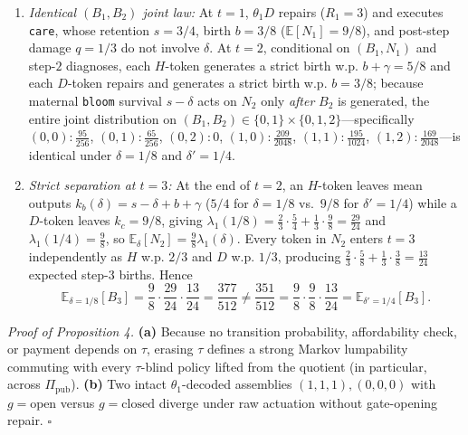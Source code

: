 \documentclass[12pt,letterpaper]{article}
\providecommand{\tightlist}{\setlength{\itemsep}{2pt}\setlength{\parskip}{0pt}}
\begin{document}
\begin{enumerate}
\def\labelenumi{\arabic{enumi}.}
\tightlist
\item
  \emph{Identical \((B_1, B_2)\) joint law:} At \(t=1\), \(\theta_1 D\)
  repairs (\(R_1=3\)) and executes \texttt{care}, whose retention
  \(s=3/4\), birth \(b=3/8\) (\(\mathbb{E}[N_1] = 9/8\)), and post-step
  damage \(q=1/3\) do not involve \(\delta\). At \(t=2\), conditional on
  \((B_1, N_1)\) and step-\(2\) diagnoses, each \(H\)-token generates a
  strict birth w.p. \(b+\gamma = 5/8\) and each \(D\)-token repairs and
  generates a strict birth w.p. \(b = 3/8\); because maternal
  \texttt{bloom} survival \(s-\delta\) acts on \(N_2\) only \emph{after}
  \(B_2\) is generated, the entire joint distribution on
  \((B_1, B_2) \in \{0,1\} \times \{0,1,2\}\)---specifically
  \((0,0): \frac{95}{256}\), \((0,1): \frac{65}{256}\), \((0,2): 0\),
  \((1,0): \frac{209}{2048}\), \((1,1): \frac{195}{1024}\),
  \((1,2): \frac{169}{2048}\)---is identical under \(\delta = 1/8\) and
  \(\delta' = 1/4\).
\item
  \emph{Strict separation at \(t=3\):} At the end of \(t=2\), an
  \(H\)-token leaves mean outputs
  \(k_b(\delta) = s - \delta + b + \gamma\) (\(5/4\) for \(\delta=1/8\)
  vs.~\(9/8\) for \(\delta'=1/4\)) while a \(D\)-token leaves
  \(k_c = 9/8\), giving
  \(\lambda_1(1/8) = \frac{2}{3}\cdot\frac{5}{4} + \frac{1}{3}\cdot\frac{9}{8} = \frac{29}{24}\)
  and \(\lambda_1(1/4) = \frac{9}{8}\), so
  \(\mathbb{E}_\delta[N_2] = \frac{9}{8}\lambda_1(\delta)\). Every token
  in \(N_2\) enters \(t=3\) independently as \(H\) w.p. \(2/3\) and
  \(D\) w.p. \(1/3\), producing
  \(\frac{2}{3}\cdot\frac{5}{8} + \frac{1}{3}\cdot\frac{3}{8} = \frac{13}{24}\)
  expected step-\(3\) births. Hence
  \[\mathbb{E}_{\delta=1/8}[B_3] = \frac{9}{8}\cdot\frac{29}{24}\cdot\frac{13}{24} = \frac{377}{512} \neq \frac{351}{512} = \frac{9}{8}\cdot\frac{9}{8}\cdot\frac{13}{24} = \mathbb{E}_{\delta'=1/4}[B_3].\]
\end{enumerate}

\emph{Proof of Proposition 4.} \textbf{(a)} Because no transition
probability, affordability check, or payment depends on \(\tau\),
erasing \(\tau\) defines a strong Markov lumpability
\citep{burkeRosenblatt1958} commuting with every \(\tau\)-blind policy
lifted from the quotient (in particular, across \(\Pi_{\mathrm{pub}}\)).
\textbf{(b)} Two intact \(\theta_1\)-decoded assemblies
\((1,1,1), (0,0,0)\) with \(g = \mathrm{open}\) versus
\(g = \mathrm{closed}\) diverge under raw actuation without gate-opening
repair. \(\square\)
\end{document}
